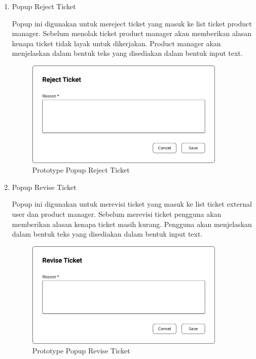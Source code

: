 \documentclass[12pt]{article}
\begin{document}
\begin{enumerate}[label=\textbf{4.\arabic*.}]
\begin{enumerate} [label=\textbf{4.3.\arabic*.}, wide, labelwidth=!, labelindent=0pt]
\begin{enumerate}[label=\arabic*.]
            \item Popup Reject Ticket
            
            Popup ini digunakan untuk mereject ticket yang masuk ke list ticket product manager. Sebelum menolak ticket product manager akan memberikan alasan kenapa ticket tidak layak untuk dikerjakan. Product manager akan menjelaskan dalam bentuk teks yang disediakan dalam bentuk input text.
            
            \begin{figure}[H]
                \centering \includegraphics[width=0.9\textwidth]{images/figma/Reject Ticket.png}
                \caption{Prototype Popup Reject Ticket}
                \label{fig:figma-reject}
            \end{figure}
            
            \item Popup Revise Ticket
            
            Popup ini digunakan untuk merevisi ticket yang masuk ke list ticket external user dan product manager. Sebelum merevisi ticket pengguna akan memberikan alasan kenapa ticket masih kurang. Pengguna akan menjelaskan dalam bentuk teks yang disediakan dalam bentuk input text.
            
            \begin{figure}[H]
                \centering \includegraphics[width=0.9\textwidth]{images/figma/Revise Ticket.png}
                \caption{Prototype Popup Revise Ticket}
                \label{fig:figma-revise}
            \end{figure}



\end{enumerate}
\end{enumerate}
\end{enumerate}
\end{document}
